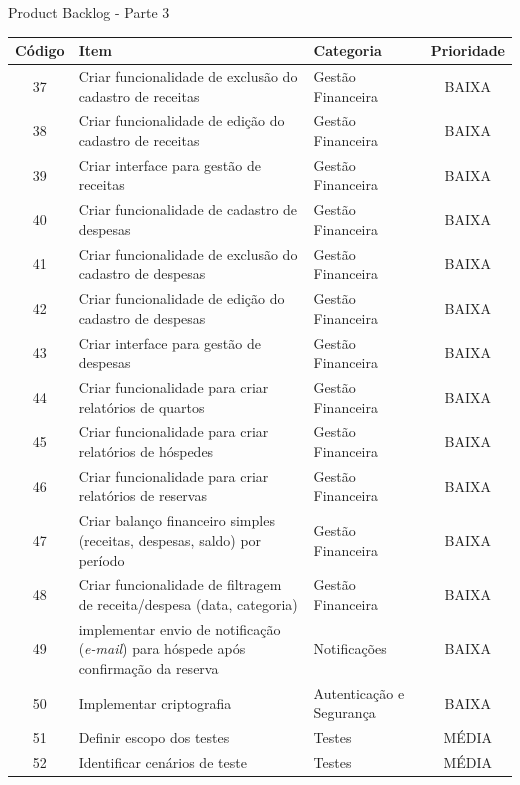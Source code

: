 \documentclass[
	12pt,				%
	openany,			%
	twoside,			%
	a4paper,			%
	english,			%
	french,				%
	spanish,			%
	brazil				%
	]{abntex2}
\begin{document}
 \begin{quadro}[H]
     \caption{Product Backlog - Parte 3}
     	\label{product_backlog_3}
     	\begin{tabular}{|c|p{6.5cm}|p{3.8cm}|c|}
     		\hline
     		\textbf{Código} & \textbf{Item} & \textbf{Categoria} & \textbf{Prioridade} \\	\hline
     		37 & Criar funcionalidade de exclusão do cadastro de receitas &
     		Gestão Financeira &	BAIXA \\ \hline
     		38 & Criar funcionalidade de edição do cadastro de receitas &
     		Gestão Financeira &	BAIXA \\ \hline
     		39 & Criar interface para gestão de receitas & Gestão Financeira & BAIXA \\ \hline
     		40 & Criar funcionalidade de cadastro de despesas &
     		Gestão Financeira & BAIXA \\ \hline
     		41 & Criar funcionalidade de exclusão do cadastro de despesas &
     		Gestão Financeira &	BAIXA \\ \hline
     		42 & Criar funcionalidade de edição do cadastro de despesas &
     		Gestão Financeira &	BAIXA \\ \hline   
     		43 & Criar interface para gestão de despesas & Gestão Financeira & BAIXA \\ \hline
     		44 & Criar funcionalidade para criar relatórios de quartos &
     		Gestão Financeira &	BAIXA \\ \hline
    		45 & Criar funcionalidade para criar relatórios de hóspedes &
    		Gestão Financeira &	BAIXA \\ \hline
     		46 & Criar funcionalidade para criar relatórios de reservas &
     		Gestão Financeira &	BAIXA \\ \hline
     		47 & Criar balanço financeiro simples (receitas, despesas, saldo) por período & Gestão Financeira & BAIXA \\ \hline
     		48 & Criar funcionalidade de filtragem de receita/despesa (data, categoria) &	Gestão Financeira & BAIXA \\ \hline
     		49 & implementar envio de notificação (\textit {e-mail}) para hóspede após confirmação da reserva & Notificações &
     		BAIXA \\ \hline
     		50 & Implementar criptografia &	Autenticação e Segurança &
     		BAIXA \\ \hline
     		51 & Definir escopo dos testes & Testes & MÉDIA \\ \hline
     		52 & Identificar cenários de teste & Testes & MÉDIA \\ \hline

\end{tabular}
\end{quadro}
\end{document}
